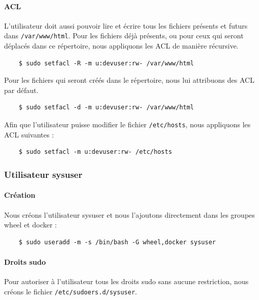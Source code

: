 \documentclass{extarticle} %
\begin{document}
    \paragraph{ACL} L'utilisateur doit aussi pouvoir lire et écrire tous les fichiers présents et futurs dans
     \texttt{/var/www/html}. Pour les fichiers déjà présents, ou pour ceux qui seront déplacés dans ce répertoire,
      nous appliquons les ACL de manière récursive.

    \begin{verbatim}
    $ sudo setfacl -R -m u:devuser:rw- /var/www/html
    \end{verbatim}

    Pour les fichiers qui seront créés dans le répertoire, nous lui attribuons des ACL par défaut.

    \begin{verbatim}
    $ sudo setfacl -d -m u:devuser:rw- /var/www/html
    \end{verbatim}

    Afin que l’utilisateur puisse modifier le fichier \texttt{/etc/hosts}, nous appliquons les ACL suivantes :

    \begin{verbatim}
    $ sudo setfacl -m u:devuser:rw- /etc/hosts
    \end{verbatim}


    \subsubsection{Utilisateur sysuser}

    \paragraph{Création} Nous créons l'utilisateur sysuser et nous l'ajoutons directement dans les groupes wheel et docker :

    \begin{verbatim}
    $ sudo useradd -m -s /bin/bash -G wheel,docker sysuser
    \end{verbatim}

    \paragraph{Droits sudo} Pour autoriser à l'utilisateur tous les droits sudo sans aucune restriction, nous créons le fichier \texttt{/etc/sudoers.d/sysuser}.
\end{document}
